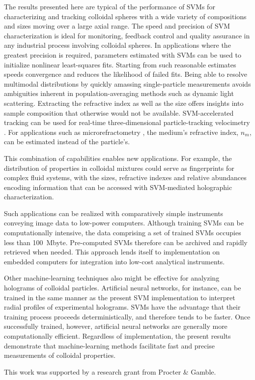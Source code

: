 The results presented here are typical of the performance of SVMs
for characterizing and tracking colloidal spheres with a wide
variety of compositions and sizes moving over a large axial range.
The speed and precision of SVM characterization
is ideal for monitoring, feedback control and quality assurance
in any industrial process involving colloidal spheres.
In applications where the greatest precision is required, parameters
estimated with SVMs can be used to initialize nonlinear least-squares
fits.
Starting from such reasonable estimates speeds convergence and
reduces the likelihood of failed fits.
Being able to resolve multimodal distributions
by quickly amassing single-particle measurements
avoids ambiguities inherent in population-averaging
methods such as dynamic light scattering.
Extracting the refractive index as well as the size offers
insights into sample composition that otherwise would
not be available.
SVM-accelerated tracking can be used for real-time
three-dimensional particle-tracking velocimetry \cite{cheong09}.
For applications such as microrefractometry \cite{shpaisman12},
the medium's refractive index, $n_m$, can 
be estimated instead of the particle's.

This combination of capabilities enables new applications.
For example, the distribution of properties in colloidal mixtures
could serve as fingerprints for complex fluid systems, with the
sizes, refractive indexes and relative abundances encoding information
that can be accessed with SVM-mediated holographic
characterization.

Such applications can be realized with comparatively
simple instruments \cite{krishnatreya14} conveying image data
to low-power computers.
Although training SVMs can be computationally intensive,
the data comprising a set of trained SVMs occupies less
than \SI{100}{\mega byte}.
Pre-computed SVMs therefore can be archived and rapidly
retrieved when needed.
This approach lends itself to
implementation on embedded computers for integration into
low-cost analytical instruments.

Other machine-learning techniques also might be effective
for analyzing holograms of colloidal particles.  Artificial
neural networks, for instance, can be trained in the same
manner as the present SVM implementation to interpret
radial profiles of experimental holograms.  SVMs have the advantage
that their training process proceeds deterministically, and therefore
tends to be faster.  Once successfully trained, however, artificial
neural networks are generally more computationally efficient.
Regardless of implementation, the present results demonstrate
that machine-learning methods facilitate
fast and precise measurements of colloidal properties.


This work was supported by a research grant from Procter \& Gamble.
